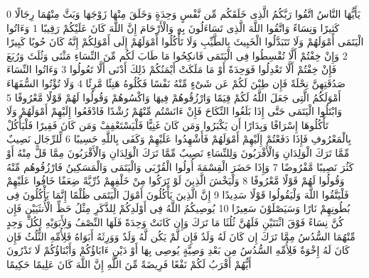 {\tiny\colorbox{cl_aya}{0}} يَأَيُّهَا النَّاسُ اتَّقُوا رَبَّكُمُ الَّذِى خَلَقَكُم مِّن نَّفْسٍ وَحِدَةٍ وَخَلَقَ مِنْهَا زَوْجَهَا وَبَثَّ مِنْهُمَا رِجَالًا كَثِيرًا وَنِسَاءً وَاتَّقُوا اللَّهَ الَّذِى تَسَاءَلُونَ بِهِ وَالْأَرْحَامَ إِنَّ اللَّهَ كَانَ عَلَيْكُمْ رَقِيبًا
{\tiny\colorbox{cl_aya}{1}} وَءَاتُوا الْيَتَمَى أَمْوَلَهُمْ وَلَا تَتَبَدَّلُوا الْخَبِيثَ بِالطَّيِّبِ وَلَا تَأْكُلُوا أَمْوَلَهُمْ إِلَى أَمْوَلِكُمْ إِنَّهُ كَانَ حُوبًا كَبِيرًا
{\tiny\colorbox{cl_aya}{2}} وَإِنْ خِفْتُمْ أَلَّا تُقْسِطُوا فِى الْيَتَمَى فَانكِحُوا مَا طَابَ لَكُم مِّنَ النِّسَاءِ مَثْنَى وَثُلَثَ وَرُبَعَ فَإِنْ خِفْتُمْ أَلَّا تَعْدِلُوا فَوَحِدَةً أَوْ مَا مَلَكَتْ أَيْمَنُكُمْ ذَلِكَ أَدْنَى أَلَّا تَعُولُوا
{\tiny\colorbox{cl_aya}{3}} وَءَاتُوا النِّسَاءَ صَدُقَتِهِنَّ نِحْلَةً فَإِن طِبْنَ لَكُمْ عَن شَىْءٍ مِّنْهُ نَفْسًا فَكُلُوهُ هَنِئًا مَّرِئًا
{\tiny\colorbox{cl_aya}{4}} وَلَا تُؤْتُوا السُّفَهَاءَ أَمْوَلَكُمُ الَّتِى جَعَلَ اللَّهُ لَكُمْ قِيَمًا وَارْزُقُوهُمْ فِيهَا وَاكْسُوهُمْ وَقُولُوا لَهُمْ قَوْلًا مَّعْرُوفًا
{\tiny\colorbox{cl_aya}{5}} وَابْتَلُوا الْيَتَمَى حَتَّى إِذَا بَلَغُوا النِّكَاحَ فَإِنْ ءَانَسْتُم مِّنْهُمْ رُشْدًا فَادْفَعُوا إِلَيْهِمْ أَمْوَلَهُمْ وَلَا تَأْكُلُوهَا إِسْرَافًا وَبِدَارًا أَن يَكْبَرُوا وَمَن كَانَ غَنِيًّا فَلْيَسْتَعْفِفْ وَمَن كَانَ فَقِيرًا فَلْيَأْكُلْ بِالْمَعْرُوفِ فَإِذَا دَفَعْتُمْ إِلَيْهِمْ أَمْوَلَهُمْ فَأَشْهِدُوا عَلَيْهِمْ وَكَفَى بِاللَّهِ حَسِيبًا
{\tiny\colorbox{cl_aya}{6}} لِّلرِّجَالِ نَصِيبٌ مِّمَّا تَرَكَ الْوَلِدَانِ وَالْأَقْرَبُونَ وَلِلنِّسَاءِ نَصِيبٌ مِّمَّا تَرَكَ الْوَلِدَانِ وَالْأَقْرَبُونَ مِمَّا قَلَّ مِنْهُ أَوْ كَثُرَ نَصِيبًا مَّفْرُوضًا
{\tiny\colorbox{cl_aya}{7}} وَإِذَا حَضَرَ الْقِسْمَةَ أُولُوا الْقُرْبَى وَالْيَتَمَى وَالْمَسَكِينُ فَارْزُقُوهُم مِّنْهُ وَقُولُوا لَهُمْ قَوْلًا مَّعْرُوفًا
{\tiny\colorbox{cl_aya}{8}} وَلْيَخْشَ الَّذِينَ لَوْ تَرَكُوا مِنْ خَلْفِهِمْ ذُرِّيَّةً ضِعَفًا خَافُوا عَلَيْهِمْ فَلْيَتَّقُوا اللَّهَ وَلْيَقُولُوا قَوْلًا سَدِيدًا
{\tiny\colorbox{cl_aya}{9}} إِنَّ الَّذِينَ يَأْكُلُونَ أَمْوَلَ الْيَتَمَى ظُلْمًا إِنَّمَا يَأْكُلُونَ فِى بُطُونِهِمْ نَارًا وَسَيَصْلَوْنَ سَعِيرًا
{\tiny\colorbox{cl_aya}{10}} يُوصِيكُمُ اللَّهُ فِى أَوْلَدِكُمْ لِلذَّكَرِ مِثْلُ حَظِّ الْأُنثَيَيْنِ فَإِن كُنَّ نِسَاءً فَوْقَ اثْنَتَيْنِ فَلَهُنَّ ثُلُثَا مَا تَرَكَ وَإِن كَانَتْ وَحِدَةً فَلَهَا النِّصْفُ وَلِأَبَوَيْهِ لِكُلِّ وَحِدٍ مِّنْهُمَا السُّدُسُ مِمَّا تَرَكَ إِن كَانَ لَهُ وَلَدٌ فَإِن لَّمْ يَكُن لَّهُ وَلَدٌ وَوَرِثَهُ أَبَوَاهُ فَلِأُمِّهِ الثُّلُثُ فَإِن كَانَ لَهُ إِخْوَةٌ فَلِأُمِّهِ السُّدُسُ مِن بَعْدِ وَصِيَّةٍ يُوصِى بِهَا أَوْ دَيْنٍ ءَابَاؤُكُمْ وَأَبْنَاؤُكُمْ لَا تَدْرُونَ أَيُّهُمْ أَقْرَبُ لَكُمْ نَفْعًا فَرِيضَةً مِّنَ اللَّهِ إِنَّ اللَّهَ كَانَ عَلِيمًا حَكِيمًا
